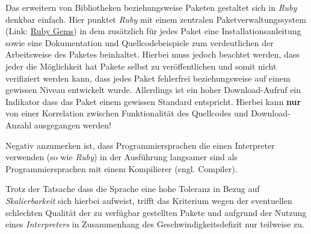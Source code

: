 \documentclass[12pt,DIV=14, version=first, BCOR=10mm,a4paper,twoside,parskip=half-,headsepline,headinclude]{scrartcl}
\begin{document}
\begin{flushleft}
Das erweitern von Bibliotheken beziehungsweise Paketen gestaltet sich in \textit{\glqq Ruby\grqq} denkbar einfach. Hier punktet \textit{\glqq Ruby\grqq} mit einem zentralen Paketverwaltungssystem (Link: \href {https://rubygems.org/} {Ruby Gems})  in dem zusätzlich für jedes Paket eine Installationsanleitung sowie eine Dokumentation und Quellcodebeispiele zum verdeutlichen der Arbeitsweise des Paketes beinhaltet. Hierbei muss jedoch beachtet werden, dass jeder die Möglichkeit hat Pakete selbst zu veröffentlichen und somit nicht verifiziert werden kann, dass jedes Paket fehlerfrei beziehungsweise auf einem gewissen Niveau entwickelt wurde. Allerdings ist ein hoher Download-Aufruf ein Indikator dass das Paket einem gewissen Standard entspricht. Hierbei kann \textbf{nur} von einer Korrelation zwischen Funktionalität des Quellcodes und Download-Anzahl ausgegangen werden!

Negativ anzumerken ist, dass Programmiersprachen die einen Interpreter verwenden (so wie \textit{\glqq Ruby\grqq}) in der Ausführung langsamer sind als Programmiersprachen mit einem Kompilierer (engl. Compiler).

Trotz der Tatsache dass die Sprache eine hohe Toleranz in Bezug auf \textit{Skalierbarkeit} sich hierbei aufweist, trifft das Kriterium wegen der eventuellen schlechten Qualität der zu verfügbar gestellten Pakete und aufgrund der Nutzung eines \textit{Interpreters} in Zusammenhang des Geschwindigkeitsdefizit nur teilweise zu.

\end{flushleft}
\end{document}
